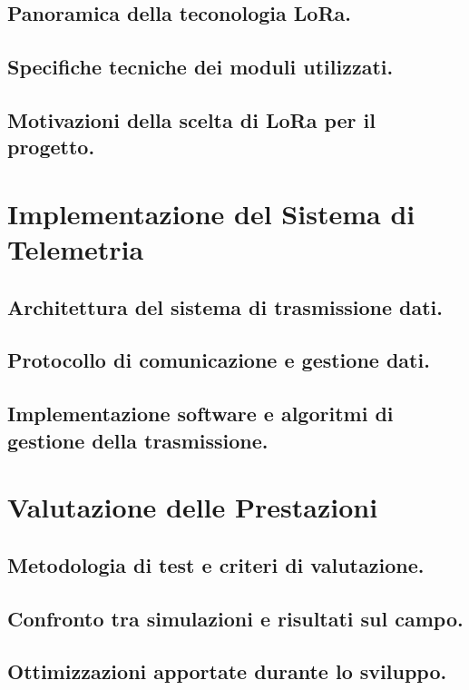 \documentclass[12pt,a4paper,twoside]{book}
\begin{document}
\section{Panoramica della teconologia LoRa.}
\cite{Andrade2022}
\section{Specifiche tecniche dei moduli utilizzati.}
\section{Motivazioni della scelta di LoRa per il progetto.}

\chapter{Implementazione del Sistema di Telemetria} \label{chap:telemetry}

\section{Architettura del sistema di trasmissione dati.}
\section{Protocollo di comunicazione e gestione dati.}
\section{Implementazione software e algoritmi di gestione della trasmissione.}

\chapter{Valutazione delle Prestazioni} \label{chap:performance}

\section{Metodologia di test e criteri di valutazione.}
\section{Confronto tra simulazioni e risultati sul campo.}
\section{Ottimizzazioni apportate durante lo sviluppo.}
\end{document}
